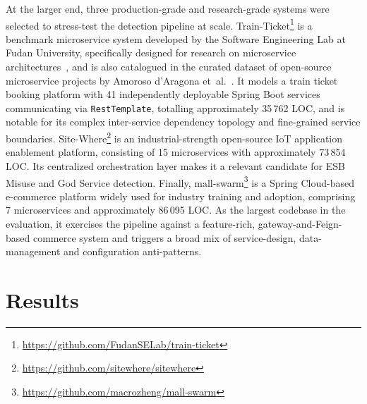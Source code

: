 \par At the larger end, three production-grade and research-grade systems were selected to stress-test the detection pipeline at scale. Train-Ticket\footnote{\url{https://github.com/FudanSELab/train-ticket}} is a benchmark microservice system developed by the Software Engineering Lab at Fudan University, specifically designed for research on microservice architectures~\cite{XZhou2018}, and is also catalogued in the curated dataset of open-source microservice projects by Amoroso d'Aragona et~al.~\cite{10.1145/3643991.3644890}. It models a train ticket booking platform with 41 independently deployable Spring Boot services communicating via \texttt{RestTemplate}, totalling approximately 35\,762 LOC, and is notable for its complex inter-service dependency topology and fine-grained service boundaries. Site-Where\footnote{\url{https://github.com/sitewhere/sitewhere}} is an industrial-strength open-source IoT application enablement platform, consisting of 15 microservices with approximately 73\,854 LOC. Its centralized orchestration layer makes it a relevant candidate for ESB Misuse and God Service detection. Finally, mall-swarm\footnote{\url{https://github.com/macrozheng/mall-swarm}} is a Spring Cloud-based e-commerce platform widely used for industry training and adoption, comprising 7 microservices and approximately 86\,095 LOC. As the largest codebase in the evaluation, it exercises the pipeline against a feature-rich, gateway-and-Feign-based commerce system and triggers a broad mix of service-design, data-management and configuration anti-patterns.


\section{Results}
\label{sec:results}


